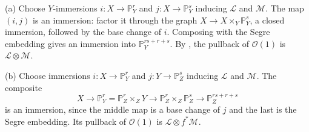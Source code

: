 (a) Choose $Y$-immersions $i:X\to\mathbb P_Y^r$ and $j:X\to\mathbb P_Y^s$ inducing $\mathcal L$ and $\mathcal M$. The map $(i,j)$ is an immersion: factor it through the graph $X\to X\times_Y\mathbb P_Y^s$, a closed immersion, followed by the base change of $i$. Composing with the Segre embedding gives an immersion into $\mathbb P_Y^{rs+r+s}$. By , the pullback of $\mathcal O(1)$ is $\mathcal L\otimes\mathcal M$.

(b) Choose immersions $i:X\to\mathbb P_Y^r$ and $j:Y\to\mathbb P_Z^s$ inducing $\mathcal L$ and $\mathcal M$. The composite
\[X\to\mathbb P_Y^r=\mathbb P_Z^r\times_ZY\to\mathbb P_Z^r\times_Z\mathbb P_Z^s\to\mathbb P_Z^{rs+r+s}\]
is an immersion, since the middle map is a base change of $j$ and the last is the Segre embedding. Its pullback of $\mathcal O(1)$ is $\mathcal L\otimes f^*\mathcal M$.
